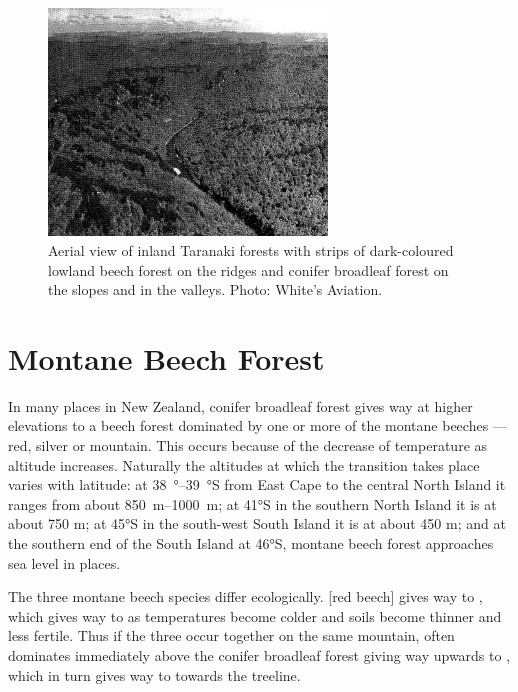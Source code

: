 \begin{figure}
	\includegraphics[width=0.66\textwidth]{graphics/fig_073}
	\centering
	\caption[Aerial view of inland Taranaki forests]{Aerial view of inland Taranaki forests with strips of dark-coloured lowland beech forest on the ridges and conifer broadleaf forest on the slopes and in the valleys.
	Photo: White's Aviation.}%
	\label{fig:73taranaki-forests}
\end{figure}

\section{Montane Beech Forest}

In many places in New Zealand, conifer broadleaf forest gives way at higher elevations to a beech forest dominated by one or more of the montane beeches --- red, silver or mountain.
This occurs because of the decrease of temperature as altitude increases.
Naturally the altitudes at which the transition takes place varies with latitude: at \SIrange{38}{39}{\degree}S from East Cape to the central North Island it ranges from about \SIrange{850}{1000}{\metre}; at \ang{41}S in the southern North Island it is at about 750 m; at \ang{45}S in the south-west South Island it is at about 450 m; and at the southern end of the South Island at \ang{46}S, montane beech forest approaches sea level in places.

The three montane beech species differ ecologically.
[red beech] gives way to , which gives way to  as temperatures become colder and soils become thinner and less fertile.
Thus if the three occur together on the same mountain,  often dominates immediately above the conifer broadleaf forest giving way upwards to , which in turn gives way to  towards the treeline.

